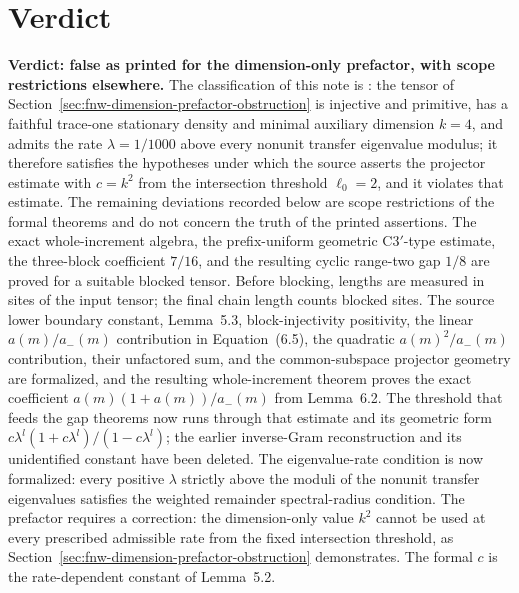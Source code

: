 \documentclass{article}
\begin{document}
\section{Verdict}
\label{sec:fnw-prefactor-verdict}

\textbf{Verdict: false as printed for the dimension-only prefactor, with
    scope restrictions elsewhere.} The classification of this note is
: the tensor of
Section~\ref{sec:fnw-dimension-prefactor-obstruction} is injective and
primitive, has a faithful trace-one stationary density and minimal auxiliary
dimension $k=4$, and admits the rate $\lambda=1/1000$ above every nonunit
transfer eigenvalue modulus; it therefore satisfies the hypotheses under which
the source asserts the projector estimate with $c=k^2$ from the intersection
threshold $\ell_0=2$, and it violates that estimate. The remaining deviations
recorded below are scope restrictions of the formal theorems and do not
concern the truth of the printed assertions. The exact whole-increment algebra, the
prefix-uniform geometric C3$'$-type estimate, the three-block coefficient
$7/16$, and the resulting cyclic range-two gap $1/8$ are proved for a suitable
blocked tensor. Before blocking, lengths are measured in sites of the input
tensor; the final chain length counts blocked sites. The source lower boundary
constant, Lemma~5.3, block-injectivity positivity, the linear $a(m)/a_-(m)$
contribution in Equation~(6.5), the quadratic $a(m)^2/a_-(m)$ contribution,
their unfactored sum, and the common-subspace projector geometry are
formalized, and the resulting whole-increment theorem proves the exact
coefficient $a(m)(1+a(m))/a_-(m)$ from Lemma~6.2. The threshold that feeds the
gap theorems now runs through that estimate and its geometric form
$c\lambda^l(1+c\lambda^l)/(1-c\lambda^l)$; the earlier inverse-Gram
reconstruction and its unidentified constant have been deleted. The eigenvalue-rate condition is now formalized: every positive
$\lambda$ strictly above the moduli of the nonunit transfer eigenvalues
satisfies the weighted remainder spectral-radius condition. The prefactor
requires a correction: the dimension-only value $k^2$ cannot be used at
every prescribed admissible rate from the fixed intersection threshold, as
Section~\ref{sec:fnw-dimension-prefactor-obstruction} demonstrates. The formal
$c$ is the rate-dependent constant of Lemma~5.2.
\end{document}
